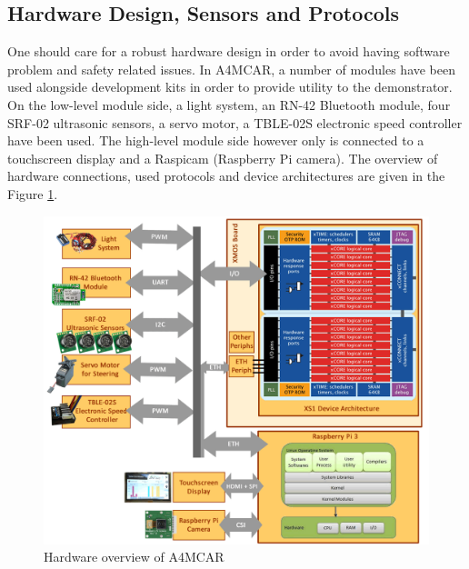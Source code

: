 \subsection{Hardware Design, Sensors and Protocols}
One should care for a robust hardware design in order to avoid having software problem and safety related issues. In A4MCAR, a number of modules have been used alongside development kits in order to provide utility to the demonstrator. On the low-level module side, a light system, an RN-42 Bluetooth module, four SRF-02 ultrasonic sensors, a servo motor, a TBLE-02S electronic speed controller have been used. The high-level module side however only is connected to a touchscreen display and a Raspicam (Raspberry Pi camera). The overview of hardware connections, used protocols and device architectures are given in the Figure \ref{fig:hwoverview}.
\begin{figure}[!ht]
	\centering
	\captionsetup{justification=centering}
	\includegraphics[width=\textwidth]{content/images/hwoverview.png}
	\caption{Hardware overview of A4MCAR}
	\label{fig:hwoverview}
\end{figure}

